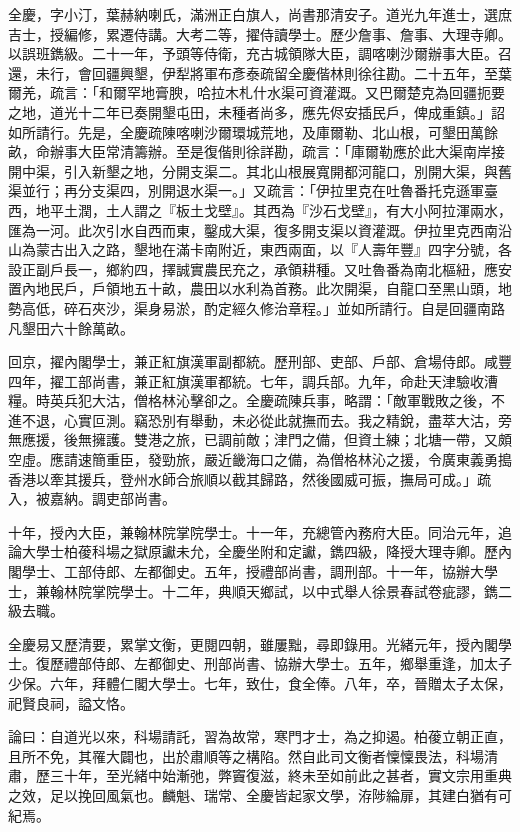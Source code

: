 \begin{pinyinscope}
全慶，字小汀，葉赫納喇氏，滿洲正白旗人，尚書那清安子。道光九年進士，選庶吉士，授編修，累遷侍講。大考二等，擢侍讀學士。歷少詹事、詹事、大理寺卿。以誤班鐫級。二十一年，予頭等侍衛，充古城領隊大臣，調喀喇沙爾辦事大臣。召還，未行，會回疆興墾，伊犁將軍布彥泰疏留全慶偕林則徐往勘。二十五年，至葉爾羌，疏言：「和爾罕地膏腴，哈拉木札什水渠可資灌溉。又巴爾楚克為回疆扼要之地，道光十二年已奏開墾屯田，未種者尚多，應先侭安插民戶，俾成重鎮。」詔如所請行。先是，全慶疏陳喀喇沙爾環城荒地，及庫爾勒、北山根，可墾田萬餘畝，命辦事大臣常清籌辦。至是復偕則徐詳勘，疏言：「庫爾勒應於此大渠南岸接開中渠，引入新墾之地，分開支渠二。其北山根展寬開都河龍口，別開大渠，與舊渠並行；再分支渠四，別開退水渠一。」又疏言：「伊拉里克在吐魯番托克遜軍臺西，地平土潤，土人謂之『板土戈壁』。其西為『沙石戈壁』，有大小阿拉渾兩水，匯為一河。此次引水自西而東，鑿成大渠，復多開支渠以資灌溉。伊拉里克西南沿山為蒙古出入之路，墾地在滿卡南附近，東西兩面，以『人壽年豐』四字分號，各設正副戶長一，鄉約四，擇誠實農民充之，承領耕種。又吐魯番為南北樞紐，應安置內地民戶，戶領地五十畝，農田以水利為首務。此次開渠，自龍口至黑山頭，地勢高低，碎石夾沙，渠身易淤，酌定經久修治章程。」並如所請行。自是回疆南路凡墾田六十餘萬畝。

回京，擢內閣學士，兼正紅旗漢軍副都統。歷刑部、吏部、戶部、倉場侍郎。咸豐四年，擢工部尚書，兼正紅旗漢軍都統。七年，調兵部。九年，命赴天津驗收漕糧。時英兵犯大沽，僧格林沁擊卻之。全慶疏陳兵事，略謂：「敵軍戰敗之後，不進不退，心實叵測。竊恐別有舉動，未必從此就撫而去。我之精銳，盡萃大沽，旁無應援，後無擁護。雙港之旅，已調前敵；津門之備，但資土練；北塘一帶，又頗空虛。應請速簡重臣，發勁旅，嚴近畿海口之備，為僧格林沁之援，令廣東義勇搗香港以牽其援兵，登州水師合旅順以截其歸路，然後國威可振，撫局可成。」疏入，被嘉納。調吏部尚書。

十年，授內大臣，兼翰林院掌院學士。十一年，充總管內務府大臣。同治元年，追論大學士柏葰科場之獄原讞未允，全慶坐附和定讞，鐫四級，降授大理寺卿。歷內閣學士、工部侍郎、左都御史。五年，授禮部尚書，調刑部。十一年，協辦大學士，兼翰林院掌院學士。十二年，典順天鄉試，以中式舉人徐景春試卷疵謬，鐫二級去職。

全慶易又歷清要，累掌文衡，更閱四朝，雖屢黜，尋即錄用。光緒元年，授內閣學士。復歷禮部侍郎、左都御史、刑部尚書、協辦大學士。五年，鄉舉重逢，加太子少保。六年，拜體仁閣大學士。七年，致仕，食全俸。八年，卒，晉贈太子太保，祀賢良祠，謚文恪。

論曰：自道光以來，科場請託，習為故常，寒門才士，為之抑遏。柏葰立朝正直，且所不免，其罹大闢也，出於肅順等之構陷。然自此司文衡者懍懍畏法，科場清肅，歷三十年，至光緒中始漸弛，弊竇復滋，終未至如前此之甚者，實文宗用重典之效，足以挽回風氣也。麟魁、瑞常、全慶皆起家文學，洊陟綸扉，其建白猶有可紀焉。


\end{pinyinscope}